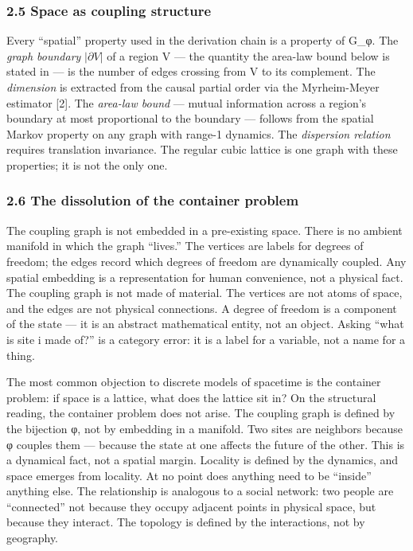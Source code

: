 \documentclass[
]{article}
\begin{document}
\hypertarget{space-as-coupling-structure}{%
\subsubsection{2.5 Space as coupling
structure}\label{space-as-coupling-structure}}

Every ``spatial'' property used in the derivation chain is a property of
G\_φ. The \emph{graph boundary} \(|\partial V|\) of a region V --- the
quantity the area-law bound below is stated in --- is the number of
edges crossing from V to its complement. The \emph{dimension} is
extracted from the causal partial order via the Myrheim-Meyer estimator
{[}2{]}. The \emph{area-law bound} --- mutual information across a
region's boundary at most proportional to the boundary --- follows from
the spatial Markov property on any graph with range-1 dynamics. The
\emph{dispersion relation} requires translation invariance. The regular
cubic lattice is one graph with these properties; it is not the only
one.

\hypertarget{the-dissolution-of-the-container-problem}{%
\subsubsection{2.6 The dissolution of the container
problem}\label{the-dissolution-of-the-container-problem}}

The coupling graph is not embedded in a pre-existing space. There is no
ambient manifold in which the graph ``lives.'' The vertices are labels
for degrees of freedom; the edges record which degrees of freedom are
dynamically coupled. Any spatial embedding is a representation for human
convenience, not a physical fact. The coupling graph is not made of
material. The vertices are not atoms of space, and the edges are not
physical connections. A degree of freedom is a component of the state
--- it is an abstract mathematical entity, not an object. Asking ``what
is site i made of?'' is a category error: it is a label for a variable,
not a name for a thing.

The most common objection to discrete models of spacetime is the
container problem: if space is a lattice, what does the lattice sit in?
On the structural reading, the container problem does not arise. The
coupling graph is defined by the bijection φ, not by embedding in a
manifold. Two sites are neighbors because φ couples them --- because the
state at one affects the future of the other. This is a dynamical fact,
not a spatial margin. Locality is defined by the dynamics, and space
emerges from locality. At no point does anything need to be ``inside''
anything else. The relationship is analogous to a social network: two
people are ``connected'' not because they occupy adjacent points in
physical space, but because they interact. The topology is defined by
the interactions, not by geography.
\end{document}
